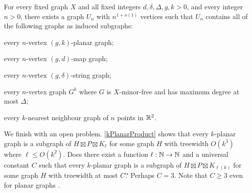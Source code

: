 \documentclass{patmorin}
\renewcommand{\geq}{\geqslant}
\renewcommand{\leq}{\leqslant}
\begin{document}
\begin{thm}
	\label{UniversalUniversal}
	For every fixed graph $X$ and all fixed integers $d,\delta,\Delta,g,k>0$, and every integer
	$n>0$, there exists a graph $U_n$ with $n^{1+o(1)}$ vertices such that
	$U_n$ contains all of the following graphs as induced subgraphs:
	\begin{compactitem}
		\item every $n$-vertex $(g,k)$-planar graph;
		\item every $n$-vertex $(g,d)$-map graph;
		\item every $n$-vertex $(g,\delta)$-string graph;
		\item every $n$-vertex graph $G^k$ where $G$ is $X$-minor-free and has maximum degree at most $\Delta$;
		\item every $k$-nearest neighbour graph of $n$ points in $\mathbb{R}^2$.
	\end{compactitem}
\end{thm}

We finish with an open problem. \cref{kPlanarProduct} shows that every $k$-planar graph is a subgraph of $H\boxtimes P \boxtimes K_\ell$ for some graph $H$ with treewidth $O(k^3)$ where $\ell\leq O(k^2)$. Does there exist a function $\ell:\mathbb{N}\to\mathbb{N}$ and a universal constant $C$ such that every $k$-planar graph is a subgraph of $H\boxtimes P \boxtimes K_{\ell(k)}$ for some graph $H$ with treewidth at most $C$?  Perhaps $C=3$. Note that $C\geq 3$ even for planar graphs \citep{dujmovic.joret.ea:planar}.

   \let\oldthebibliography=\thebibliography
   \let\endoldthebibliography=\endthebibliography
   \renewenvironment{thebibliography}[1]{%
     \begin{oldthebibliography}{#1}%
       \setlength{\parskip}{0ex}%
       \setlength{\itemsep}{0ex}%
   }{\end{oldthebibliography}}

%
%

\end{document}
